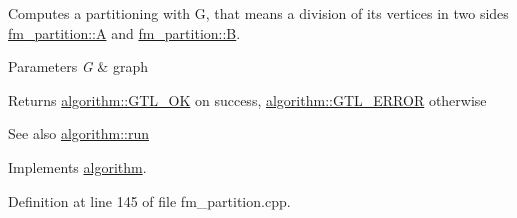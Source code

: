 Computes a partitioning with {\ttfamily G}, that means a division of its vertices in two sides {\ttfamily \mbox{\hyperlink{classfm__partition_a738e75c601403754e61e6dac623fd3ab}{fm\+\_\+partition\+::A}} } and {\ttfamily \mbox{\hyperlink{classfm__partition_a42515c44eecb7ba3e2ec549a877ef238}{fm\+\_\+partition\+::B}}}.


\begin{DoxyParams}{Parameters}
{\em G} & graph \\
\hline
\end{DoxyParams}
\begin{DoxyReturn}{Returns}
{\ttfamily \mbox{\hyperlink{classalgorithm_af1a0078e153aa99c24f9bdf0d97f6710a5114c20e4a96a76b5de9f28bf15e282b}{algorithm\+::\+G\+T\+L\+\_\+\+OK}}} on success, {\ttfamily \mbox{\hyperlink{classalgorithm_af1a0078e153aa99c24f9bdf0d97f6710a6fcf574690bbd6cf710837a169510dd7}{algorithm\+::\+G\+T\+L\+\_\+\+E\+R\+R\+OR}}} otherwise 
\end{DoxyReturn}
\begin{DoxySeeAlso}{See also}
\mbox{\hyperlink{classalgorithm_a734b189509a8d6b56b65f8ff772d43ca}{algorithm\+::run}} 
\end{DoxySeeAlso}


Implements \mbox{\hyperlink{classalgorithm_a734b189509a8d6b56b65f8ff772d43ca}{algorithm}}.



Definition at line 145 of file fm\+\_\+partition.\+cpp.


